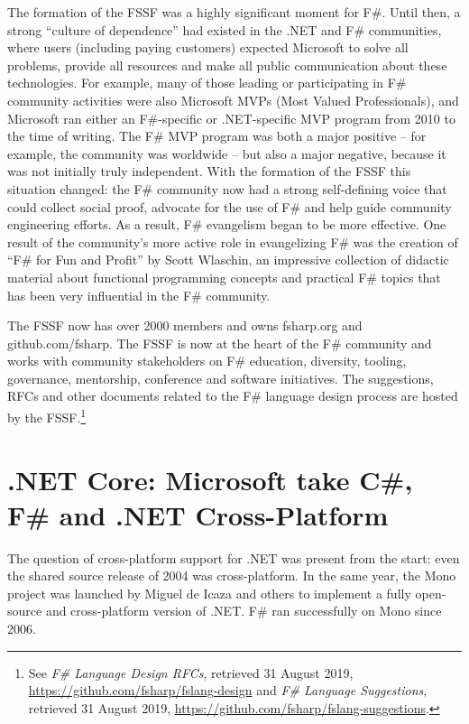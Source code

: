 \documentclass[acmsmall,review]{acmart}\settopmatter{printfolios=true,printccs=false,printacmref=false}
\begin{document}
The formation of the FSSF was a highly significant moment for F\#.  Until then, a strong “culture of dependence” had existed in
the .NET and F\# communities, where users (including paying customers) expected Microsoft to solve all problems, provide all
resources and make all public communication about these technologies.  For example, many of those leading or participating
in F\# community activities were also Microsoft MVPs (Most Valued Professionals), and Microsoft ran either an F\#-specific or
.NET-specific MVP program from 2010 to the time of writing.  The F\# MVP program was both a major positive – for example, the
community was worldwide – but also a major negative, because it was not initially truly independent. With the formation of the
FSSF this situation changed: the F\# community now had a strong self-defining voice that could collect social proof, advocate for
the use of F\# and help guide community engineering efforts. As a result, F\# evangelism began to be more effective. One result of
the community’s more active role in evangelizing F\# was the creation of “F\# for Fun and Profit” by Scott Wlaschin, an impressive
collection of didactic material about functional programming concepts and practical F\# topics that has been very influential in the F\# community.

The FSSF now has over 2000 members and owns fsharp.org and github.com/fsharp. The FSSF is now at the heart of the F\# community
and works with community stakeholders on F\# education, diversity, tooling, governance, mentorship, conference and software
initiatives.  The suggestions, RFCs and other documents related to the F\# language design process are hosted by the
FSSF.\footnote{See \textit{F\# Language Design RFCs}, retrieved 31 August 2019, \url{https://github.com/fsharp/fslang-design} and \textit{F\# Language Suggestions}, retrieved 31 August 2019, \url{https://github.com/fsharp/fslang-suggestions}.}

\section*{.NET Core: Microsoft take C\#, F\# and .NET Cross-Platform}

The question of cross-platform support for .NET was present from the start: even the shared source release of 2004 was
cross-platform.  In the same year, the Mono project was launched by Miguel de Icaza and others to implement a fully open-source and
cross-platform version of .NET. F\# ran successfully on Mono since 2006.  
\end{document}
